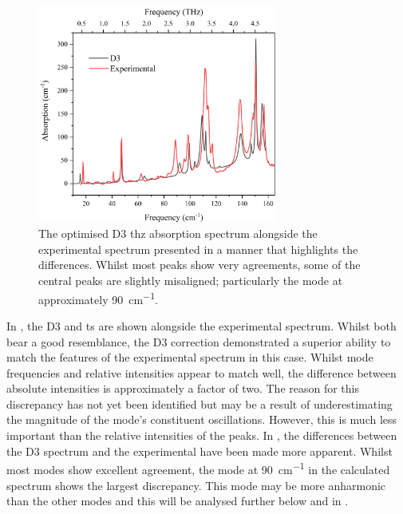 \begin{figure}[!htb]
    \centering
    \includegraphics[width=0.7\textwidth]{Figures/Spectra/D3ExpDiffG3.png}
    \captionsetup{font = footnotesize, justification = centering}
    \caption[The Optimised D3 Terahertz Absorption Spectrum alongside the Experimental Spectrum]{The optimised D3 \acrshort{thz} absorption spectrum alongside the experimental spectrum presented in a manner that highlights the differences. Whilst most peaks show very agreements, some of the central peaks are slightly misaligned; particularly the mode at approximately \SI{90}{cm^{-1}}.}
    \label{fig:diff_d3_exp}
\end{figure}

In , the D3 and \acrshort{ts} are shown alongside the experimental spectrum. Whilst both bear a good resemblance, the D3 correction demonstrated a superior ability to match the features of the experimental spectrum in this case. Whilst mode frequencies and relative intensities appear to match well, the difference between absolute intensities is approximately a factor of two. The reason for this discrepancy has not yet been identified but may be a result of underestimating the magnitude of the mode's constituent oscillations. However, this is much less important than the relative intensities of the peaks. In , the differences between the D3 spectrum and the experimental have been made more apparent. Whilst most modes show excellent agreement, the mode at \SI{90}{cm^{-1}} in the calculated spectrum shows the largest discrepancy. This mode may be more anharmonic than the other modes and this will be analysed further below and in .

